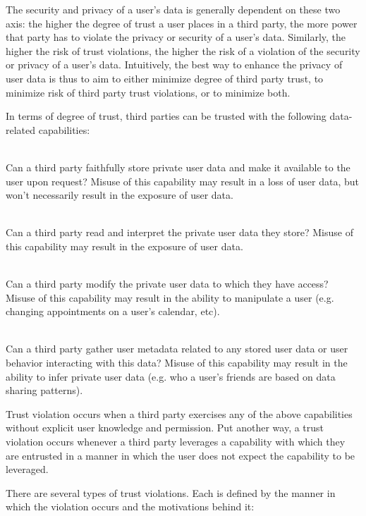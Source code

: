 The security and privacy of a user's data is generally dependent on
these two axis: the higher the degree of trust a user places in a
third party, the more power that party has to violate the privacy or
security of a user's data. Similarly, the higher the risk of trust
violations, the higher the risk of a violation of the security or
privacy of a user's data.  Intuitively, the best way to enhance the
privacy of user data is thus to aim to either minimize degree of third
party trust, to minimize risk of third party trust violations, or to
minimize both.

In terms of degree of trust, third parties can be trusted with the
following data-related capabilities:

\begin{packed_desc}
\item[Storage (S):] \hfill \\ Can a third party faithfully store
  private user data and make it available to the user upon request?
  Misuse of this capability may result in a loss of user data, but
  won't necessarily result in the exposure of user data.
\item[Access (R):] \hfill \\ Can a third party read and interpret the
  private user data they store? Misuse of this capability may result
  in the exposure of user data.
\item[Manipulation (W):] \hfill \\ Can a third party modify the
  private user data to which they have access? Misuse of this
  capability may result in the ability to manipulate a user
  (e.g. changing appointments on a user's calendar, etc).
\item[Meta-analysis (M):] \hfill \\ Can a third party gather user
  metadata related to any stored user data or user behavior
  interacting with this data? Misuse of this capability may result in
  the ability to infer private user data (e.g. who a user's friends
  are based on data sharing patterns).
\end{packed_desc}

Trust violation occurs when a third party exercises any of the above
capabilities without explicit user knowledge and permission. Put
another way, a trust violation occurs whenever a third party leverages
a capability with which they are entrusted in a manner in which the
user does not expect the capability to be leveraged.

There are several types of trust violations. Each is defined by the
manner in which the violation occurs and the motivations behind it:

